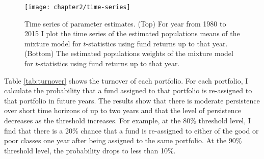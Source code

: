 		\begin{figure}[p]
			\small
			\centering
			\texttt{[image: chapter2/time-series]}
			\captionsetup{skip=-20pt, font=footnotesize, justification=justified, width=\textwidth}
			\caption[Time series of parameter estimates]{Time series of parameter estimates. (Top) For year from 1980 to 2015 I plot the time series of the estimated populations means of the mixture model for $t$-statistics using fund returns up to that year. (Bottom) The estimated populations weights of the mixture model for $t$-statistics using fund returns up to that year.}
			\label{fig:estimates}
		\end{figure}

		Table \ref{tab:turnover} shows the turnover of each portfolio.  For each portfolio, I calculate the probability that a fund assigned to that portfolio is re-assigned to that portfolio in future years.  The results show that there is moderate persistence over short time horizons of up to two years and that the level of persistence decreases as the threshold increases. For example, at the 80\% threshold level, I find that there is a 20\% chance that a fund is re-assigned to either of the good or poor classes one year after being assigned to the same portfolio.  At the 90\% threshold level, the probability drops to less than 10\%.

